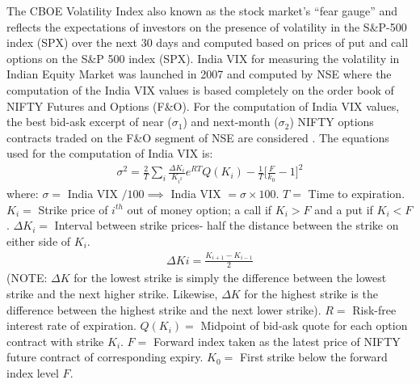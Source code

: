 \documentclass[conference]{IEEEtran}
\begin{document}
The CBOE Volatility Index also known as the stock market’s “fear gauge” and reflects the expectations of investors on the presence of volatility in the S\&P-500 index (SPX) over the next 30 days and computed based on prices of put and call options on the S\&P 500 index (SPX).
India VIX for measuring the volatility in Indian Equity Market was launched in 2007 and computed by NSE where the computation of the India VIX values is based completely on the order book of NIFTY Futures and Options (F\&O). For the computation of India VIX values, the best bid-ask excerpt of near ($\sigma_{1}$) and next-month ($\sigma_{2}$) NIFTY options contracts traded on the F\&O segment of NSE are considered \cite{b4}. \newline
The equations used for the computation of India VIX is:
\begin{align}
    \sigma^{2} = \frac{2}{T} \sum_{i}\frac{\Delta K_{i}}{K_{i^{2}}}e^{{RT}}Q(K_{i}) - \frac{1}{T}\Big[\frac{F}{k_{0}} - 1\Big]^2 \label{eq: 4}
\end{align}
where: \newline
    $\sigma = $ India VIX $/100 \implies$ India VIX $ = \sigma \times 100$. \newline
    $T =$ Time to expiration. \newline
    $K_{i} = $ Strike price of $i^{th}$ out of money option; a call if $K_{i} > F$ and a put if $K_{i} < F$. \newline
    $\Delta K_{i} =$ Interval between strike prices- half the distance between the strike on either side of $K_{i}$. 
    \begin{align}
        \Delta K{i} = \frac{K_{i + 1} - K_{i - 1}}{2} \label{eq: 5}
    \end{align}
    (NOTE: $\Delta K$ for the lowest strike is simply the difference between the lowest strike and the next higher strike. Likewise, $\Delta K$ for the highest strike is the difference between the highest strike and the next lower strike).\newline
    $R =$ Risk-free interest rate of expiration.
    $Q(K_{i}) =$ Midpoint of bid-ask quote for each option contract with strike $K_{i}$. \newline
    $F =$ Forward index taken as the latest price of NIFTY future contract of corresponding expiry. \newline
    $K_{0} =$ First strike below the forward index level $F$. \newline
    
\end{document}
